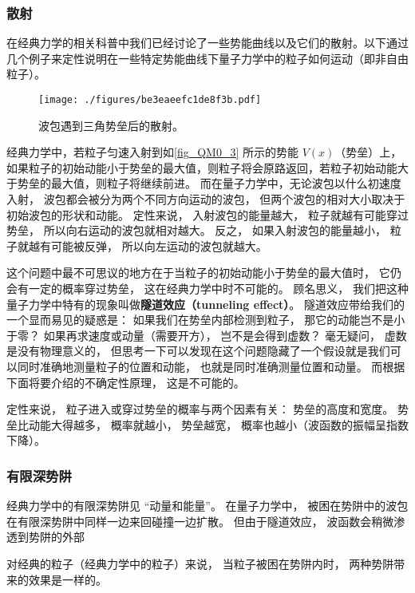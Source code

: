 \subsubsection{散射}
在经典力学的相关科普中我们已经讨论了一些势能曲线以及它们的散射。以下通过几个例子来定性说明在一些特定势能曲线下量子力学中的粒子如何运动（即非自由粒子）。

\begin{figure}[ht]
\centering
\texttt{[image: ./figures/be3eaeefc1de8f3b.pdf]}
\caption{波包遇到三角势垒后的散射。} \label{fig_QM0_3} %
\end{figure}

经典力学中，若粒子匀速入射到如\autoref{fig_QM0_3} 所示的势能 $V(x)$（势垒）上， 如果粒子的初始动能小于势垒的最大值，则粒子将会原路返回，若粒子初始动能大于势垒的最大值，则粒子将继续前进。 而在量子力学中，无论波包以什么初速度入射， 波包都会被分为两个不同方向运动的波包， 但两个波包的相对大小取决于初始波包的形状和动能。 定性来说， 入射波包的能量越大， 粒子就越有可能穿过势垒， 所以向右运动的波包就相对越大。 反之， 如果入射波包的能量越小， 粒子就越有可能被反弹， 所以向左运动的波包就越大。

这个问题中最不可思议的地方在于当粒子的初始动能小于势垒的最大值时， 它仍会有一定的概率穿过势垒， 这在经典力学中时不可能的。 顾名思义， 我们把这种量子力学中特有的现象叫做\textbf{隧道效应（tunneling effect）}。 隧道效应带给我们的一个显而易见的疑惑是： 如果我们在势垒内部检测到粒子， 那它的动能岂不是小于零？ 如果再求速度或动量（需要开方）， 岂不是会得到虚数？ 毫无疑问， 虚数是没有物理意义的， 但思考一下可以发现在这个问题隐藏了一个假设就是我们可以同时准确地测量粒子的位置和动能， 也就是同时准确测量位置和动量。 而根据下面将要介绍的不确定性原理， 这是不可能的。

定性来说， 粒子进入或穿过势垒的概率与两个因素有关： 势垒的高度和宽度。 势垒比动能大得越多， 概率就越小， 势垒越宽， 概率也越小（波函数的振幅呈指数下降）。

\subsubsection{有限深势阱}
经典力学中的有限深势阱见 “动量和能量”。 在量子力学中， 被困在势阱中的波包在有限深势阱中同样一边来回碰撞一边扩散。 但由于隧道效应， 波函数会稍微渗透到势阱的外部

对经典的粒子（经典力学中的粒子）来说， 当粒子被困在势阱内时， 两种势阱带来的效果是一样的。


